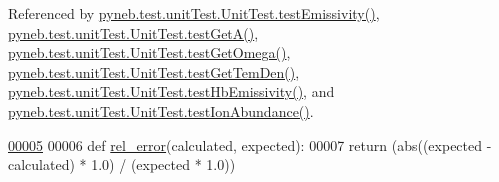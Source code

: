 Referenced by \hyperlink{unit_test_8py_source_l00023}{pyneb.\-test.\-unit\-Test.\-Unit\-Test.\-test\-Emissivity()}, \hyperlink{unit_test_8py_source_l00090}{pyneb.\-test.\-unit\-Test.\-Unit\-Test.\-test\-Get\-A()}, \hyperlink{unit_test_8py_source_l00100}{pyneb.\-test.\-unit\-Test.\-Unit\-Test.\-test\-Get\-Omega()}, \hyperlink{unit_test_8py_source_l00111}{pyneb.\-test.\-unit\-Test.\-Unit\-Test.\-test\-Get\-Tem\-Den()}, \hyperlink{unit_test_8py_source_l00066}{pyneb.\-test.\-unit\-Test.\-Unit\-Test.\-test\-Hb\-Emissivity()}, and \hyperlink{unit_test_8py_source_l00076}{pyneb.\-test.\-unit\-Test.\-Unit\-Test.\-test\-Ion\-Abundance()}.


\begin{DoxyCode}
\hypertarget{namespacepyneb_1_1test_1_1unit_test_l00005}{}\hyperlink{namespacepyneb_1_1test_1_1unit_test_a3c7e23eb1c34daaa75eec988c96dc7b9}{00005} 
00006 \textcolor{keyword}{def }\hyperlink{namespacepyneb_1_1test_1_1unit_test_a3c7e23eb1c34daaa75eec988c96dc7b9}{rel\_error}(calculated, expected):
00007         \textcolor{keywordflow}{return} (abs((expected - calculated) * 1.0) / (expected * 1.0))

\end{DoxyCode}
